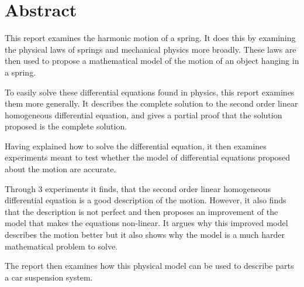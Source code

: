 \section*{Abstract}
This report examines the harmonic motion of a spring. 
It does this by examining the physical laws of springs and mechanical physics more broadly. 
These laws are then used to propose a mathematical model of the motion of an object hanging in a spring.

To easily solve these differential equations found in physics, this report examines them more generally. 
It describes the complete solution to the second order linear homogeneous differential equation, and gives a partial proof that the solution proposed is the complete solution. 

Having explained how to solve the differential equation, it then examines experiments meant to test whether the model of differential equations proposed about the motion are accurate.

Through 3 experiments it finds, that the second order linear homogeneous differential equation is a good description of the motion.
However, it also finds that the description is not perfect and then proposes an improvement of the model that makes the equations non-linear.
It argues why this improved model describes the motion better but it also shows why the model is a much harder mathematical problem to solve. 

The report then examines how this physical model can be used to describe parts a car suspension system.

